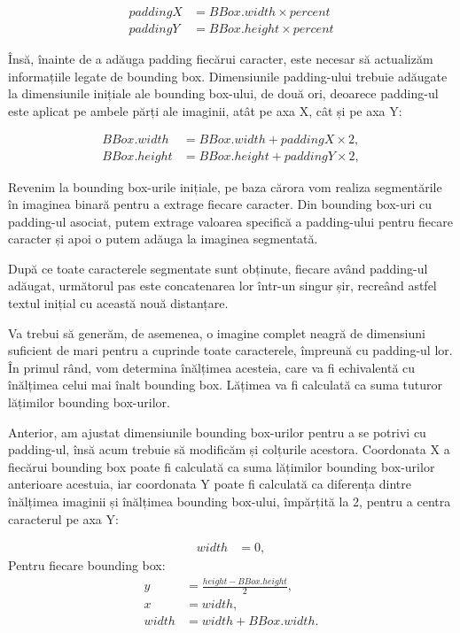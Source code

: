 \documentclass[a4paper,12pt]{report}
\begin{document}
\[
    \begin{aligned}
        paddingX & = BBox.width \times percent  \\
        paddingY & = BBox.height \times percent
    \end{aligned}
\]

Însă, înainte de a adăuga padding fiecărui caracter, este necesar să actualizăm informațiile legate de bounding box. Dimensiunile padding-ului trebuie adăugate la dimensiunile inițiale ale bounding box-ului, de două ori, deoarece padding-ul este aplicat pe ambele părți ale imaginii, atât pe axa X, cât și pe axa Y:

\[
    \begin{aligned}
        BBox.width  & = BBox.width + paddingX \times 2,  \\
        BBox.height & = BBox.height + paddingY \times 2,
    \end{aligned}
\]

Revenim la bounding box-urile inițiale, pe baza cărora vom realiza segmentările în imaginea binară pentru a extrage fiecare caracter. Din bounding box-uri cu padding-ul asociat, putem extrage valoarea specifică a padding-ului pentru fiecare caracter și apoi o putem adăuga la imaginea segmentată.

După ce toate caracterele segmentate sunt obținute, fiecare având padding-ul adăugat, următorul pas este concatenarea lor într-un singur șir, recreând astfel textul inițial cu această nouă distanțare.

Va trebui să generăm, de asemenea, o imagine complet neagră de dimensiuni suficient de mari pentru a cuprinde toate caracterele, împreună cu padding-ul lor. În primul rând, vom determina înălțimea acesteia, care va fi echivalentă cu înălțimea celui mai înalt bounding box. Lățimea va fi calculată ca suma tuturor lățimilor bounding box-urilor.

Anterior, am ajustat dimensiunile bounding box-urilor pentru a se potrivi cu padding-ul, însă acum trebuie să modificăm și colțurile acestora. Coordonata X a fiecărui bounding box poate fi calculată ca suma lățimilor bounding box-urilor anterioare acestuia, iar coordonata Y poate fi calculată ca diferența dintre înălțimea imaginii și înălțimea bounding box-ului, împărțită la 2, pentru a centra caracterul pe axa Y:

\[
    \begin{aligned}
        width & = 0,
    \end{aligned}
\]
Pentru fiecare bounding box:
\[
    \begin{aligned}
        y     & = \frac{height - BBox.height}{2}, \\
        x     & = width,                          \\
        width & = width + BBox.width.
    \end{aligned}
\]
\end{document}
